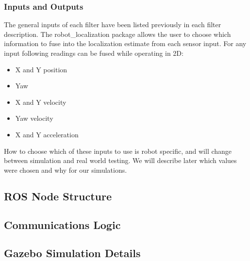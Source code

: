 \documentclass[thesis.tex]{subfile}
\begin{document}
\subsubsection{Inputs and Outputs}
The general inputs of each filter have been listed previously in each filter description. The robot\_localization package allows the user to choose which information to fuse into the localization estimate from each sensor input. For any input following readings can be fused while operating in 2D:
\begin{itemize}
\item X and Y position
\item Yaw
\item X and Y velocity
\item Yaw velocity
\item X and Y acceleration
\end{itemize}
How to choose which of these inputs to use is robot specific, and will change between simulation and real world testing. We will describe later which values were chosen and why for our simulations.
 
\subsection{ROS Node Structure}
\subsection{Communications Logic}
\subsection{Gazebo Simulation Details}
\end{document}
